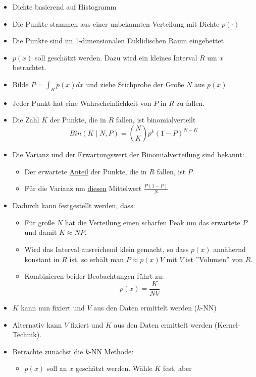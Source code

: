 \documentclass{scrartcl}
\begin{document}
\begin{itemize}
	\item Dichte basierend auf Histogramm
	\item Die Punkte stammen aus einer unbekannten Verteilung mit Dichte $ 
	p(\cdot) $
	\item Die Punkte sind im 1-dimensionalen Euklidischen Raum eingebettet
	\item $ p(x) $ soll geschätzt werden. Dazu wird ein kleines Interval $ R $ 
	um $ x $ betrachtet.
	\item Bilde $ P = \int_R p(x) dx $ und ziehe Stichprobe der Größe $ N $ aus 
	$ p(x) $
	\item Jeder Punkt hat eine Wahrscheinlichkeit von $ P $ in $ R $ zu fallen.
	\item Die Zahl $ K $ der Punkte, die in $ R $ fallen, ist binomialverteilt
	\[ Bin(K \mid N,P) = \binom{N}{K} p^k (1-P)^{N-K} \]
	\item Die Varianz und der Erwartungswert der Binomialverteilung sind 
	bekannt:
	\begin{itemize}
		\item Der erwartete \underline{Anteil} der Punkte, die in $ R $ fallen, 
		ist $ P $.
		\item Für die Varianz um \underline{diesen} Mittelwert $ 
		\frac{P(1-P)}{N} $
	\end{itemize}
	\item Dadurch kann festgestellt werden, dass:
	\begin{itemize}
		\item Für große $ N $ hat die Verteilung einen scharfen Peak um das 
		erwartete $ P $ und damit $ K \approx NP $.
		\item Wird das Interval ausreichend klein gemacht, so dass $ p(x) $ 
		annähernd konstant in $ R $ ist, so erhält man $ P \approx p(x) V $ mit 
		$ V $ ist ''Volumen'' von $ R $.
		\item Kombinieren beider Beobachtungen führt zu:
		\[ p(x) = \frac{K}{NV} \]
	\end{itemize}
	\item $ K $ kann nun fixiert und $ V $ aus den Daten ermittelt werden ($ k 
	$-NN)
	\item Alternativ kann $ V $ fixiert und $ K $ aus den Daten ermittelt 
	werden (Kernel-Technik).
	\item Betrachte zunächst die $ k $-NN Methode:
	\begin{itemize}
		\item $ p(x) $ soll an $ x $ geschätzt werden. Wähle $ K $ fest, aber 

\end{itemize}
\end{itemize}
\end{document}

